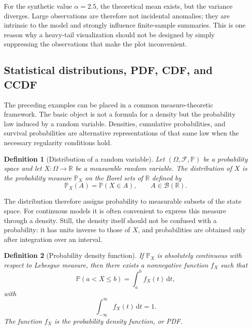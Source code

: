 \documentclass[12pt]{article}
\newcommand{\dd}{{\mathrm{d}}}
\newcommand{\R}{\mathbb{R}}
\newtheorem{definition}{Definition}[section]
\numberwithin{equation}{section}
\begin{document}
For the synthetic value $\alpha=2.5$, the theoretical mean exists, but the variance diverges. Large observations are therefore not incidental anomalies; they are intrinsic to the model and strongly influence finite-sample summaries. This is one reason why a heavy-tail visualization should not be designed by simply suppressing the observations that make the plot inconvenient.

\subsection{Statistical distributions, PDF, CDF, and CCDF}

The preceding examples can be placed in a common measure-theoretic framework. The basic object is not a formula for a density but the probability law induced by a random variable. Densities, cumulative probabilities, and survival probabilities are alternative representations of that same law when the necessary regularity conditions hold.

\begin{definition}[Distribution of a random variable]
Let $(\Omega,\mathcal{F},\mathbb{P})$ be a probability space and let $X:\Omega\rightarrow\R$ be a measurable random variable. The distribution of $X$ is the probability measure $\mathbb{P}_X$ on the Borel sets of $\R$ defined by
\begin{equation}
 \mathbb{P}_X(A)=\mathbb{P}(X\in A),
 \qquad A\in\mathcal{B}(\R).
\end{equation}
\end{definition}

The distribution therefore assigns probability to measurable subsets of the state space. For continuous models it is often convenient to express this measure through a density. Still, the density itself should not be confused with a probability: it has units inverse to those of $X$, and probabilities are obtained only after integration over an interval.

\begin{definition}[Probability density function]
If $\mathbb{P}_X$ is absolutely continuous with respect to Lebesgue measure, then there exists a nonnegative function $f_X$ such that
\begin{equation}
 \mathbb{P}(a<X\leq b)=\int_a^b f_X(t)\,\dd t,
\end{equation}
with
\begin{equation}
 \int_{-\infty}^{\infty} f_X(t)\,\dd t=1.
\end{equation}
The function $f_X$ is the probability density function, or PDF.
\end{definition}
\end{document}
